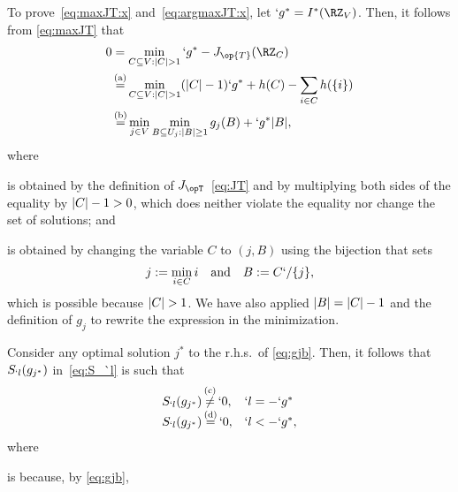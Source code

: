 \begin{Proof}
	To prove~\eqref{eq:maxJT:x} and~\eqref{eq:argmaxJT:x}, let $`g^*=I^*(\RZ_V)$. Then, it follows from \eqref{eq:maxJT} that
		\begin{align}
			0&=\min_{C\subseteq V:\abs{C}>1}`g^*-J_{\op{T}}(\RZ_C) \nonumber \\
			&\utag{a}=\min_{C\subseteq V:\abs{C}>1}(\abs{C}-1)`g^*+h(C)-\sum_{i\in C}h(\Set{i}) \nonumber \\
			&\utag{b}=\min_{j\in V}\min_{B\subseteq U_j:\abs{B}\geq1} g_j(B)+`g^*\abs{B},
			\label{eq:gjb}
		\end{align}
	where
\begin{compactitem}
	\item {} is obtained by the definition of $J_{\opT}$~\eqref{eq:JT} and by multiplying both
		sides of the equality by $\abs{C}-1>0$, which does neither violate the equality nor change the
		set of solutions; and
	\item {} is obtained by changing the variable $C$ to $(j,B)$ using the bijection that sets
	\begin{align*}
		j:=\min_{i\in C} i
		\kern 1em \text {and}\kern1em B:=C`/\Set{j},
	\end{align*}
	which is possible because $\abs {C}>1$.
	We have also applied $\abs {B}=\abs {C}-1$ and the definition of $g_j$ to rewrite the expression in the minimization. %
\end{compactitem}
Consider any optimal solution $j^*$ to the r.h.s.\ of \eqref{eq:gjb}.
Then, it follows that $S_{`l}(g_{j^*})$ in~\eqref{eq:S_`l} is such that 
\begin{align*}
	\begin{array}{ll}
		S_{`l}(g_{j^*}) 
		 \utag{c}\neq `0, & `l=-`g^* \\
		S_{`l}(g_{j^*}) 
		 \utag{d}= `0, & `l<-`g^*,
	\end{array}
\end{align*}
where
\begin{compactitem}
	\item {} is because, by \eqref{eq:gjb},

\end{compactitem}
\end{Proof}

